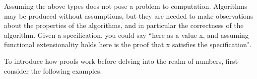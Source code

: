 \documentclass[ProjectReport]{subfiles}
\begin{document}
Assuming the above types does not pose a problem to computation. Algorithms may be produced without assumptions, but they are needed to make observations about the properties of the algorithms, and in particular the correctness of the algorithm. Given a specification, you could say ``here as a value x, and assuming functional extensionality holds here is the proof that x satisfies the specification". 

To introduce how proofs work before delving into the realm of numbers, first consider the following examples.

\begin{comment}
When building a library, certainly many of the initial proofs may be auto-solved by Agda, but in my experience asking Agda to look for a proof results in an indefinite hang due to the size of the terms I am working with. If Agda compiles the code, then I can sure that the proofs I am writing is correct up to the interpretation of the types I write, but I cannot rely on Agda to auto-generate proofs for me.
\end{comment}
\end{document}
